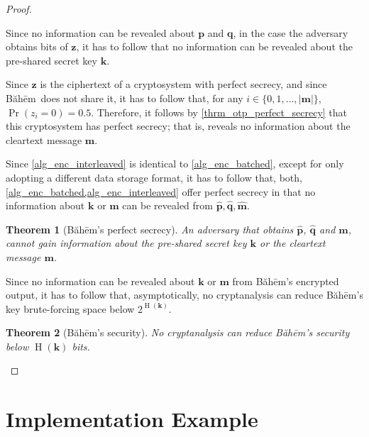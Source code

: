 \documentclass[twocolumn,hidelinks]{article}
\newcommand{\baheem}{Băhēm}
\DeclareMathOperator{\entropy}{H}
\newtheorem{theorem}{Theorem}[section]
\begin{document}
\begin{proof}
\begin{description}[itemsep=0em]
\begin{description}[itemsep=0em]
                Since no information can be revealed about $\mathbf{p}$ and
                $\mathbf{q}$, in the case the adversary obtains bits of
                $\mathbf{z}$, it has to follow that no information can be
                revealed about the pre-shared secret key $\mathbf{k}$.

            \item[$\mathbf{m} \oplus \mathbf{z} = \mathbf{\hat m}$.]  Since
                $\mathbf{z}$ is the ciphertext of a cryptosystem with
                perfect secrecy, and since \baheem\ does not share it, it
                has to follow that, for any $i \in \{0, 1, \ldots,
                |\mathbf{m}|\}$, $\Pr(z_i=0) = 0.5$.  Therefore, it follows
                by \cref{thrm_otp_perfect_secrecy} that this cryptosystem
                has perfect secrecy; that is, reveals no information about
                the cleartext message $\mathbf{m}$.
        \end{description}
\end{description}

Since \cref{alg_enc_interleaved} is identical to \cref{alg_enc_batched},
except for only adopting a different data storage format, it has to follow
that, both, \cref{alg_enc_batched,alg_enc_interleaved} offer perfect
secrecy in that no information about $\mathbf{k}$ or
$\mathbf{m}$ can be revealed from $\mathbf{\hat p},
\mathbf{\hat q}, \mathbf{\hat m}$.

\begin{theorem}[\baheem's perfect secrecy]
    An adversary that obtains $\mathbf{\hat p}$, $\mathbf{\hat q}$ and
    $\mathbf{\hat m}$, cannot gain information about the pre-shared secret
    key $\mathbf{k}$ or the cleartext message $\mathbf{m}$.
    \label{thrm_baheem_perfect_secrecy}
\end{theorem}

Since no information can be revealed about $\mathbf{k}$ or $\mathbf{m}$
from \baheem's encrypted output, it has to follow that, asymptotically, no
cryptanalysis can reduce \baheem's key brute-forcing space below
$2^{\entropy(\mathbf{k})}$.

\begin{theorem}[\baheem's security]
    No cryptanalysis can reduce \baheem's security below
    $\entropy(\mathbf{k})$ bits.
    \label{thrm_baheem_security}
\end{theorem}
\end{proof}

\section{Implementation Example}
\end{document}
